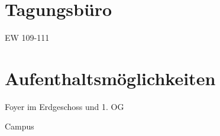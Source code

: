 \documentclass[compress,]{beamer}
\begin{document}
\section{Tagungsbüro}
\begin{frame}{EW 109-111}
\end{frame}


\section{Aufenthaltsmöglichkeiten}
\begin{frame}{Foyer im Erdgeschoss und 1. OG}
\end{frame}

\begin{frame}{Campus}
\end{frame}
\end{document}
